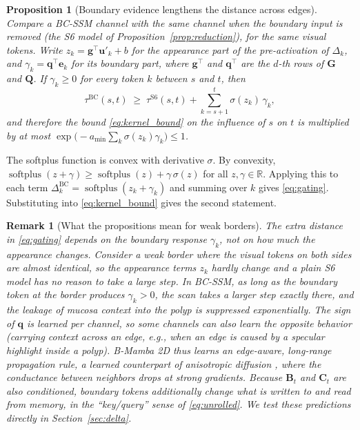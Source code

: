 \documentclass[journal]{IEEEtran}
\newtheorem{proposition}{Proposition}
\newtheorem{remark}{Remark}
\newcommand{\R}{\mathbb{R}}
\newcommand{\vect}[1]{\bm{#1}}
\newcommand{\softplus}{\operatorname{softplus}}
\newcommand{\Dt}{\Delta}
\begin{document}
\begin{proposition}[Boundary evidence lengthens the distance across edges]
\label{prop:gating}
Compare a BC-SSM channel with the same channel when the boundary input is removed (the S6 model of Proposition~\ref{prop:reduction}), for the same visual tokens. Write $z_k=\vect{g}^{\top}\vect{u}'_k+b$ for the appearance part of the pre-activation of $\Dt_k$, and $\gamma_k=\vect{q}^{\top}\vect{e}_k$ for its boundary part, where $\vect{g}^{\top}$ and $\vect{q}^{\top}$ are the $d$-th rows of $\vect{G}$ and $\vect{Q}$. If $\gamma_k\ge0$ for every token $k$ between $s$ and $t$, then
\begin{equation}
  \tau^{\text{BC}}(s,t) \;\ge\; \tau^{\text{S6}}(s,t) + \sum_{k=s+1}^{t}\sigma(z_k)\,\gamma_k ,
  \label{eq:gating}
\end{equation}
and therefore the bound \eqref{eq:kernel_bound} on the influence of $s$ on $t$ is multiplied by at most $\exp\!\big(-a_{\min}\sum_{k}\sigma(z_k)\gamma_k\big)\le1$.
\end{proposition}
\begin{IEEEproof}
The softplus function is convex with derivative $\sigma$. By convexity, $\softplus(z+\gamma)\ge\softplus(z)+\gamma\,\sigma(z)$ for all $z,\gamma\in\R$. Applying this to each term $\Dt_k^{\text{BC}}=\softplus(z_k+\gamma_k)$ and summing over $k$ gives \eqref{eq:gating}. Substituting into \eqref{eq:kernel_bound} gives the second statement.
\end{IEEEproof}

\begin{remark}[What the propositions mean for weak borders]
The extra distance in \eqref{eq:gating} depends on the boundary response $\gamma_k$, \emph{not} on how much the appearance changes. Consider a weak border where the visual tokens on both sides are almost identical, so the appearance terms $z_k$ hardly change and a plain S6 model has no reason to take a large step. In BC-SSM, as long as the boundary token at the border produces $\gamma_k>0$, the scan takes a larger step exactly there, and the leakage of mucosa context into the polyp is suppressed exponentially. The sign of $\vect{q}$ is learned per channel, so some channels can also learn the opposite behavior (carrying context \emph{across} an edge, e.g., when an edge is caused by a specular highlight inside a polyp). B-Mamba 2D thus learns an \emph{edge-aware, long-range} propagation rule, a learned counterpart of anisotropic diffusion \cite{perona1990anisotropic}, where the conductance between neighbors drops at strong gradients. Because $\vect{B}_t$ and $\vect{C}_t$ are also conditioned, boundary tokens additionally change \emph{what} is written to and read from memory, in the ``key/query'' sense of \eqref{eq:unrolled}. We test these predictions directly in Section~\ref{sec:delta}.
\end{remark}
\end{document}
